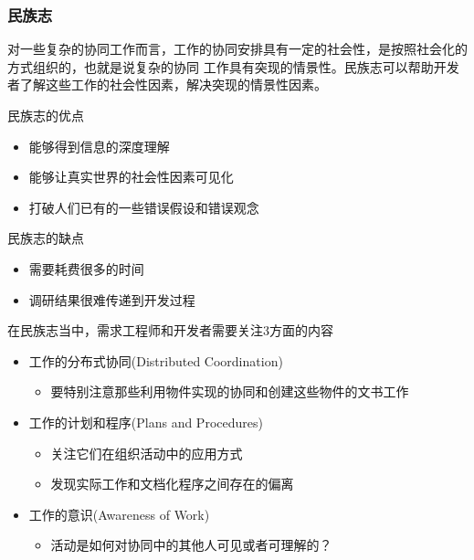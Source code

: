 \subsubsection{民族志}
对一些复杂的协同工作而言，工作的协同安排具有一定的社会性，是按照社会化的方式组织的，也就是说复杂的协同 工作具有突现的情景性。民族志可以帮助开发者了解这些工作的社会性因素，解决突现的情景性因素。

民族志的优点
\vspace{-0.8em}
\begin{multicols}{2}
    \begin{itemize}
        \item 能够得到信息的深度理解
        \item 能够让真实世界的社会性因素可见化
        \item 打破人们已有的一些错误假设和错误观念
    \end{itemize}
\end{multicols}
\vspace{-1em}

民族志的缺点
\vspace{-0.8em}
\begin{multicols}{2}
    \begin{itemize}
        \item 需要耗费很多的时间
        \item 调研结果很难传递到开发过程
    \end{itemize}
\end{multicols}
\vspace{-1em}

在民族志当中，需求工程师和开发者需要关注3方面的内容
\begin{itemize}
    \item 工作的分布式协同(Distributed Coordination)
    \begin{itemize}
        \item 要特别注意那些利用物件实现的协同和创建这些物件的文书工作
    \end{itemize}
    \item 工作的计划和程序(Plans and Procedures)
    \begin{itemize}
        \item 关注它们在组织活动中的应用方式
        \item 发现实际工作和文档化程序之间存在的偏离
    \end{itemize}
    \item  工作的意识(Awareness of Work)
    \begin{itemize}
        \item 活动是如何对协同中的其他人可见或者可理解的？
    \end{itemize}
\end{itemize}

